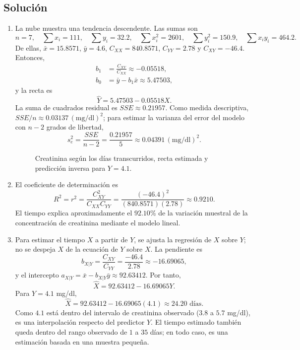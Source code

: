\subsection*{Solución}
\begin{enumerate}
    \item[\textbf{a)}] La nube muestra una tendencia descendente. Las sumas son
    \[
    n=7,\quad \sum x_i=111,\quad \sum y_i=32.2,\quad
    \sum x_i^2=2601,\quad \sum y_i^2=150.9,\quad \sum x_iy_i=464.2.
    \]
    De ellas, $\bar x=15.8571$, $\bar y=4.6$, $C_{XX}=840.8571$, $C_{YY}=2.78$ y $C_{XY}=-46.4$. Entonces,
    \begin{align*}
    b_1&=\frac{C_{XY}}{C_{XX}}\approx-0.05518,\\
    b_0&=\bar y-b_1\bar x\approx5.47503,
    \end{align*}
    y la recta es
    \[
    \boxed{\widehat Y=5.47503-0.05518X.}
    \]
    La suma de cuadrados residual es $SSE\approx0.21957$. Como medida descriptiva, $SSE/n\approx0.03137\,(\text{mg/dl})^2$; para estimar la varianza del error del modelo con $n-2$ grados de libertad,
    \[
    s_e^2=\frac{SSE}{n-2}=\frac{0.21957}{5}\approx0.04391\,(\text{mg/dl})^2.
    \]
    \begin{figure}[H]
    \centering
    
    \caption{Creatinina según los días transcurridos, recta estimada y predicción inversa para $Y=4.1$.}
    \label{fig:clase5-creatinina}
    \end{figure}

    \item[\textbf{b)}] El coeficiente de determinación es
    \[
    R^2=r^2=\frac{C_{XY}^2}{C_{XX}C_{YY}}
    =\frac{(-46.4)^2}{(840.8571)(2.78)}\approx0.9210.
    \]
    El tiempo explica aproximadamente el $92.10\%$ de la variación muestral de la concentración de creatinina mediante el modelo lineal.

    \item[\textbf{c)}] Para estimar el tiempo $X$ a partir de $Y$, se ajusta la regresión de $X$ sobre $Y$; no se despeja $X$ de la ecuación de $Y$ sobre $X$. La pendiente es
    \[
    b_{X|Y}=\frac{C_{XY}}{C_{YY}}=\frac{-46.4}{2.78}\approx-16.69065,
    \]
    y el intercepto $a_{X|Y}=\bar x-b_{X|Y}\bar y\approx92.63412$. Por tanto,
    \[
    \widehat X=92.63412-16.69065Y.
    \]
    Para $Y=4.1$ mg/dl,
    \[
    \widehat X=92.63412-16.69065(4.1)\approx24.20\text{ días}.
    \]
    Como $4.1$ está dentro del intervalo de creatinina observado ($3.8$ a $5.7$ mg/dl), es una interpolación respecto del predictor $Y$. El tiempo estimado también queda dentro del rango observado de $1$ a $35$ días; en todo caso, es una estimación basada en una muestra pequeña.
\end{enumerate}

\clearpage